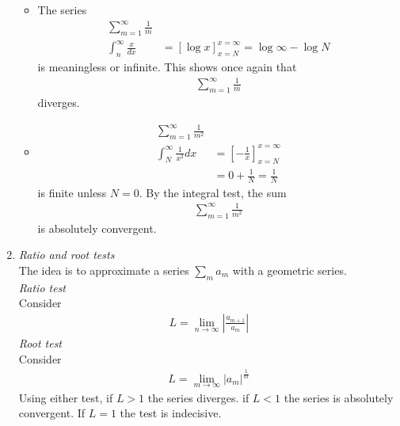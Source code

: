 \begin{enumerate}
	
	\begin{ex}
		\begin{itemize}
			\item
			The series
			\begin{align*}
			\sum_{m=1}^\infty \frac 1 m & \\
			\int_n^\infty \frac x {dx} & = [\log x ]^{x= \infty}_{x =N} = \log \infty - \log N
			\end{align*}
			is meaningless or infinite. This shows once again that
			\begin{align*}
			\sum_{m=1}^\infty \frac 1 m
			\end{align*}
			diverges.
			\item
			\begin{align*}
			\sum_{m=1}^\infty \frac 1 {m^2} & \\
			\int_N^\infty \frac 1 {x^2} dx & = \left[- \frac 1 x \right]^{x=\infty}_{x=N} \\
			& = 0 + \frac 1 N = \frac 1 N
			\end{align*}
			is finite unless $N=0$. By the integral test, the sum
			\begin{align*}
			\sum_{m=1}^\infty \frac 1 {m^2}
			\end{align*}
			is absolutely convergent.
		\end{itemize}
	\end{ex}
	\item
	\emph{Ratio and root tests} \\
	The idea is to approximate a series $\sum_m a_m$ with a geometric series. \\
	\emph{Ratio test} \\
	Consider
	\begin{align*}
	L = \lim_{n\to \infty} \left| \frac{a_{m+1}}{a_m} \right|
	\end{align*}
	\emph{Root test} \\
	Consider 
	\begin{align*}
	L = \lim_{m \to \infty} |a_m|^{\frac 1 m}
	\end{align*}
	Using either test, if $L>1$ the series diverges. if $L<1$ the series is absolutely convergent. If $L = 1$ the test is indecisive.
	

\end{enumerate}
